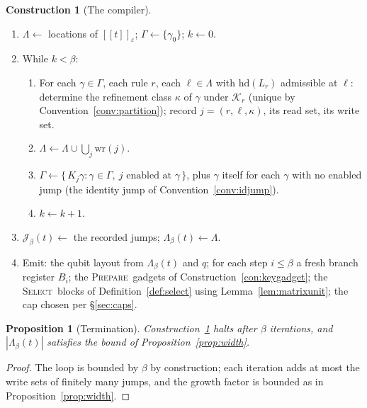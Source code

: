 \documentclass[11pt]{article}
\theoremstyle{definition}
\newtheorem{construction}[definition]{Construction}
\theoremstyle{plain}
\newtheorem{proposition}[definition]{Proposition}
\newcommand{\sem}[1]{[\![#1]\!]}
\newcommand{\Loc}{\Lambda}
\newcommand{\Jumps}{\mathcal{J}}
\newcommand{\PREP}{\textsc{Prepare}}
\newcommand{\SEL}{\textsc{Select}}
\begin{document}
\begin{construction}[The compiler]\label{con:compiler}\rm
\begin{enumerate}[leftmargin=2em,label=\arabic*.]
  \item $\Loc \gets$ locations of $\sem{t}_\varepsilon$; $\Gamma \gets \{\gamma_0\}$; $k\gets 0$.
  \item While $k < \beta$:
    \begin{enumerate}[label=2.\arabic*]
      \item For each $\gamma\in\Gamma$, each rule $r$, each $\ell\in\Loc$ with
            $\mathrm{hd}(L_r)$ admissible at $\ell$: determine the refinement class $\kappa$ of
            $\gamma$ under $\mathcal{K}_r$ (unique by Convention~\ref{conv:partition});
            record $j=(r,\ell,\kappa)$, its read set, its write set.
      \item $\Loc \gets \Loc \cup \bigcup_j \mathrm{wr}(j)$.
      \item $\Gamma \gets \{\,K_j\gamma : \gamma\in\Gamma,\ j \text{ enabled at }\gamma\,\}$,
            plus $\gamma$ itself for each $\gamma$ with no enabled jump (the identity jump of
            Convention~\ref{conv:idjump}).
      \item $k \gets k+1$.
    \end{enumerate}
  \item $\Jumps_\beta(t) \gets$ the recorded jumps; $\Loc_\beta(t)\gets\Loc$.
  \item Emit: the qubit layout from $\Loc_\beta(t)$ and $q$; for each step $i\le\beta$ a fresh
        branch register $B_i$; the \PREP\ gadgets of Construction~\ref{con:keygadget}; the
        \SEL\ blocks of Definition~\ref{def:select} using Lemma~\ref{lem:matrixunit}; the cap
        chosen per \S\ref{sec:caps}.
\end{enumerate}
\end{construction}

\begin{proposition}[Termination]\label{prop:terminates}
Construction~\ref{con:compiler} halts after $\beta$ iterations, and $|\Loc_\beta(t)|$ satisfies
the bound of Proposition~\ref{prop:width}.
\end{proposition}

\begin{proof}
The loop is bounded by $\beta$ by construction; each iteration adds at most the write sets of
finitely many jumps, and the growth factor is bounded as in Proposition~\ref{prop:width}.
\end{proof}
\end{document}
